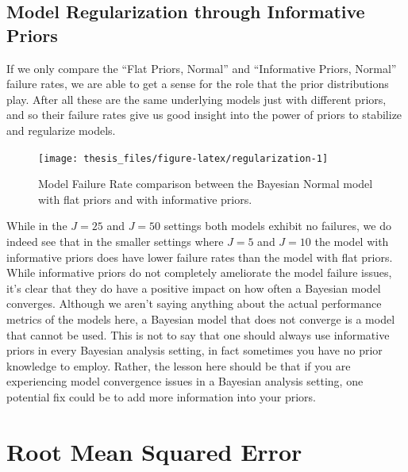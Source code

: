 \documentclass[12pt,twoside]{reedthesis}
\begin{document}
\hypertarget{model-regularization-through-informative-priors}{%
\subsection{Model Regularization through Informative Priors}\label{model-regularization-through-informative-priors}}

If we only compare the ``Flat Priors, Normal'' and ``Informative Priors, Normal'' failure rates, we are able to get a sense for the role that the prior distributions play. After all these are the same underlying models just with different priors, and so their failure rates give us good insight into the power of priors to stabilize and regularize models.
\begin{figure}

{\centering \texttt{[image: thesis\_files/figure-latex/regularization-1]} 

}

\caption{Model Failure Rate comparison between the Bayesian Normal model with flat priors and with informative priors.}\label{fig:regularization}
\end{figure}
While in the \(J = 25\) and \(J = 50\) settings both models exhibit no failures, we do indeed see that in the smaller settings where \(J = 5\) and \(J = 10\) the model with informative priors does have lower failure rates than the model with flat priors. While informative priors do not completely ameliorate the model failure issues, it's clear that they do have a positive impact on how often a Bayesian model converges. Although we aren't saying anything about the actual performance metrics of the models here, a Bayesian model that does not converge is a model that cannot be used. This is not to say that one should always use informative priors in every Bayesian analysis setting, in fact sometimes you have no prior knowledge to employ. Rather, the lesson here should be that if you are experiencing model convergence issues in a Bayesian analysis setting, one potential fix could be to add more information into your priors.

\hypertarget{root-mean-squared-error}{%
\section{Root Mean Squared Error}\label{root-mean-squared-error}}
\end{document}
